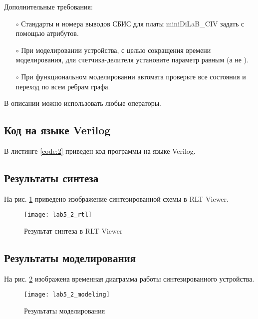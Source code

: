 Дополнительные требования:
\begin{itemize}
	\item[$\circ$] Стандарты и номера выводов СБИС для платы miniDiLaB\_CIV задать с помощью атрибутов.
	\item[$\circ$] При моделировании устройства, с целью сокращения времени моделирования, для счетчика-делителя установите параметр  равным  (а не ).
	\item[$\circ$] При функциональном моделировании автомата проверьте все состояния и переход по всем ребрам графа.
\end{itemize}

В описании можно использовать любые операторы.

\subsection{Код на языке Verilog}

В листинге \ref{code:2} приведен код программы на языке Verilog.


\vspace{-0.5cm}

\subsection{Результаты синтеза}

На рис. \ref{fig:lab5_2_rtl} приведено изображение синтезированной схемы в RLT Viewer.

\begin{figure}[H]
\begin{center}
	\texttt{[image: lab5\_2\_rtl]}
	\caption{Результат синтеза в RLT Viewer}
	\label{fig:lab5_2_rtl}
\end{center}
\end{figure}

\newpage

\subsection{Результаты моделирования}
\label{sec:lab5_2_modeling}

На рис. \ref{fig:lab5_2_modeling} изображена временная диаграмма работы синтезированного устройства.

\begin{figure}[H]
\begin{center}
	\texttt{[image: lab5\_2\_modeling]}
	\caption{Результаты моделирования}
	\label{fig:lab5_2_modeling}
\end{center}
\end{figure}

